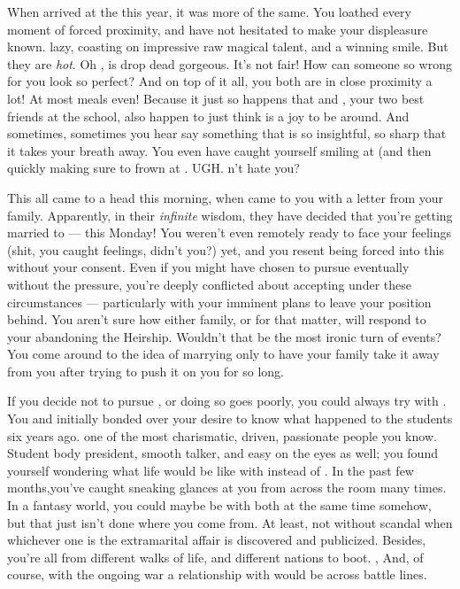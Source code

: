 \documentclass[char]{GL2020}
\begin{document}
When \cChupStudent{\they} arrived at the \pSchool{} this year, it was more of the same. You loathed every moment of forced proximity, and have not hesitated to make your displeasure known. \cChupStudent{\Theyare} lazy, coasting on impressive raw magical talent, and a winning smile. But they are \emph{hot}. Oh \cTechGod{}, \cChupStudent{} is drop dead gorgeous. It’s not fair! How can someone so wrong for you look so perfect? And on top of it all, you both are in close proximity a lot!  At most meals even!  Because it just so happens that \cAmbition{} and \cPresident{}, your two best friends at the school, also happen to just think \cChupStudent{} is a joy to be around.  And sometimes, sometimes you hear \cChupStudent{} say something that is so insightful, so sharp that it takes your breath away.  You even have caught yourself smiling at \cChupStudent{} (and then quickly making sure to frown at \cChupStudent{\them}.  UGH.  \cChupStudent{\Do}n’t \cChupStudent{\they} hate you?  

This all came to a head this morning, when \cDiplomat{} came to you with a letter from your family. Apparently, in their \emph{infinite} wisdom, they have decided that you're getting married to \cChupStudent{} — this Monday! You weren't even remotely ready to face your feelings (shit, you caught feelings, didn’t you?) yet, and you resent being forced into this without your consent. Even if you might have chosen to pursue \cChupStudent{} eventually without the pressure, you're deeply conflicted about accepting under these circumstances — particularly with your imminent plans to leave your position behind. You aren't sure how either family, or \cChupStudent{} for that matter, will respond to your abandoning the Heirship. Wouldn't that be the most ironic turn of events? You come around to the idea of marrying \cChupStudent{} only to have your family take it away from you after trying to push it on you for so long. 

If you decide not to pursue \cChupStudent{}, or doing so goes poorly, you could always try with \cPresident{\full}. You and \cPresident{} initially bonded over your desire to know what happened to the students six years ago. \cPresident{\Theyare} one of the most charismatic, driven, passionate people you know.   Student body president, smooth talker, and easy on the eyes as well; you  found yourself wondering what life would be like with \cPresident{} instead of \cChupStudent{}. In the past few months,you've caught \cPresident{} sneaking glances at you from across the room many times. In a fantasy world, you could maybe be with both at the same time somehow, but that just isn't done where you come from. At least, not without scandal when whichever one is the extramarital affair is discovered and publicized. Besides, you're all from different walks of life, and different nations to boot. , And, of course, with the ongoing war a relationship with \cPresident{} would be across battle lines.
\end{document}
